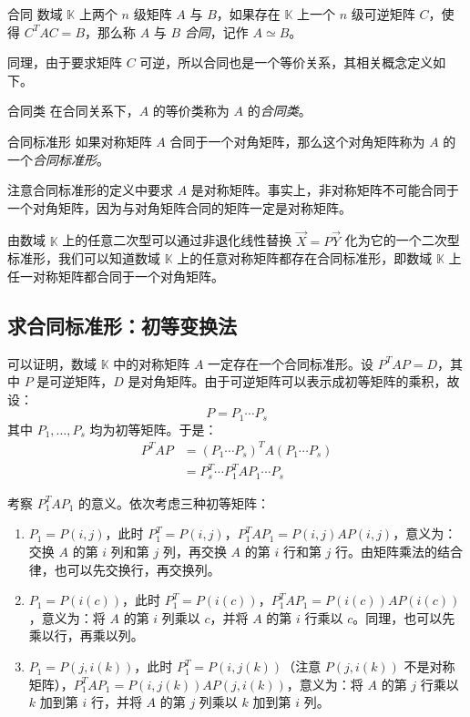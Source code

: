 \begin{definition}{合同}
	数域 $\mathbb K$ 上两个 $n$ 级矩阵 $A$ 与 $B$，如果存在 $\mathbb K$ 上一个 $n$ 级可逆矩阵 $C$，使得 $C^T AC = B$，那么称 $A$ 与 $B$ \emph{合同}，记作 $A \simeq B$。
\end{definition}

同理，由于要求矩阵 $C$ 可逆，所以合同也是一个等价关系，其相关概念定义如下。

\begin{definition}{合同类}
	在合同关系下，$A$ 的等价类称为 $A$ 的\emph{合同类}。
\end{definition}

\begin{definition}{合同标准形}
	如果对称矩阵 $A$ 合同于一个对角矩阵，那么这个对角矩阵称为 $A$ 的一个\emph{合同标准形}。
\end{definition}

注意合同标准形的定义中要求 $A$ 是对称矩阵。事实上，非对称矩阵不可能合同于一个对角矩阵，因为与对角矩阵合同的矩阵一定是对称矩阵。

由数域 $\mathbb K$ 上的任意二次型可以通过非退化线性替换 $\vec X = P \vec Y$ 化为它的一个二次型标准形，我们可以知道数域 $\mathbb K$ 上的任意对称矩阵都存在合同标准形，即数域 $\mathbb K$ 上任一对称矩阵都合同于一个对角矩阵。

\subsection{求合同标准形：初等变换法}

可以证明，数域 $\mathbb K$ 中的对称矩阵 $A$ 一定存在一个合同标准形。设 $P^T A P = D$，其中 $P$ 是可逆矩阵，$D$ 是对角矩阵。由于可逆矩阵可以表示成初等矩阵的乘积，故设：
$$
P = P_1 \cdots P_s
$$
其中 $P_1, \ldots, P_s$ 均为初等矩阵。于是：
$$
\begin{aligned}
	P^T A P &= (P_1 \cdots P_s)^T A (P_1 \cdots P_s)
	\\&=
	P_s^T \cdots P_1^T A P_1 \cdots P_s
\end{aligned}
$$

考察 $P_1^T A P_1$ 的意义。依次考虑三种初等矩阵：
\begin{enumerate}
	\item $P_1 = P(i, j)$，此时 $P_1^T = P(i, j)$，$P_1^T A P_1 = P(i, j) A P(i, j)$，意义为：交换 $A$ 的第 $i$ 列和第 $j$ 列，再交换 $A$ 的第 $i$ 行和第 $j$ 行。由矩阵乘法的结合律，也可以先交换行，再交换列。
	\item $P_1 = P(i(c))$，此时 $P_1^T = P(i(c))$，$P_1^T A P_1 = P(i(c)) A P(i(c))$，意义为：将 $A$ 的第 $i$ 列乘以 $c$，并将 $A$ 的第 $i$ 行乘以 $c$。同理，也可以先乘以行，再乘以列。
	\item $P_1 = P(j, i(k))$，此时 $P_1^T = P(i, j(k))$（注意 $P(j, i(k))$ 不是对称矩阵），$P_1^T A P_1 = P(i, j(k)) A P(j, i(k))$，意义为：将 $A$ 的第 $j$ 行乘以 $k$ 加到第 $i$ 行，并将 $A$ 的第 $j$ 列乘以 $k$ 加到第 $i$ 列。
\end{enumerate}

